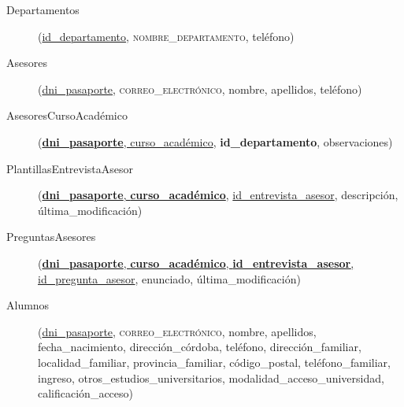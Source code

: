   \begin{description}
    \item[Departamentos] \begin{flushleft}(\underline{id\_departamento},
    \textsc{nombre\_departamento}, teléfono)\end{flushleft}
  \end{description}

  \begin{description}
    \item[Asesores] \begin{flushleft}(\underline{dni\_pasaporte},
    \textsc{correo\_electrónico}, nombre, apellidos, teléfono)\end{flushleft}
  \end{description}

  \begin{description}
    \item[AsesoresCursoAcadémico] \begin{flushleft}(\underline{\textbf{dni\_pasaporte},
    curso\_académico}, \textbf{id\_departamento}, observaciones)\end{flushleft}
  \end{description}

  \begin{description}
    \item[PlantillasEntrevistaAsesor] \begin{flushleft}(\underline{\textbf{dni\_pasaporte},
    \textbf{curso\_académico},} \underline{id\_entrevista\_asesor}, descripción,
    última\_modificación)\end{flushleft}
  \end{description}

  \begin{description}
    \item[PreguntasAsesores] \begin{flushleft}(\underline{\textbf{dni\_pasaporte},
    \textbf{curso\_académico}, \textbf{id\_entrevista\_asesor},}
    \underline{id\_pregunta\_asesor}, enunciado, última\_modificación)\end{flushleft}
  \end{description}

  \begin{description}
    \item[Alumnos] \begin{flushleft}(\underline{dni\_pasaporte},
    \textsc{correo\_electrónico}, nombre, apellidos, fecha\_nacimiento,
    dirección\_córdoba, teléfono, dirección\_familiar, localidad\_familiar,
    provincia\_familiar, código\_postal, teléfono\_familiar, ingreso,
    otros\_estudios\_universitarios, modalidad\_acceso\_universidad,
    calificación\_acceso)\end{flushleft}
  \end{description}

